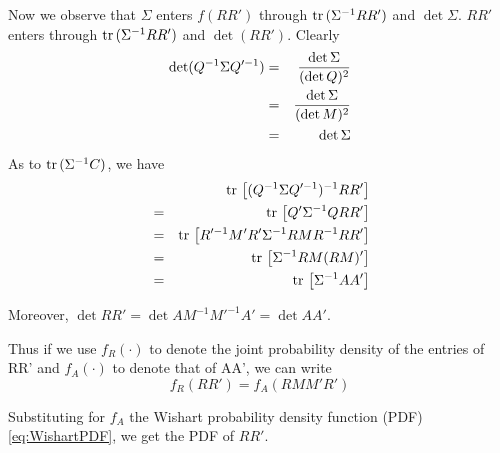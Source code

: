 \documentclass{report}
\begin{document}
Now we observe that $\Sigma$ enters $f(RR')$ through $\text{tr}\, (\Sigma^{-1}
RR')$ and $\det \Sigma$. $RR'$ enters through $\text{tr}\, (\Sigma^{-1}
RR')$ and $\det (RR')$. Clearly
\begin{eqnarray*}
  \det (Q^{-1}\Sigma Q'^{-1}) &=& \det \Sigma \over (\det Q)^2 \\
  &=& \det \Sigma \over (\det M)^2 \\
  &=& \det \Sigma
\end{eqnarray*}
As to $\text{tr}\, (\Sigma^{-1} C)$, we have
\begin{eqnarray*}
  && \text{tr}\,\left[(Q^{-1}\Sigma Q'^{-1})^{-1} RR'\right] \\
  &=& \text{tr}\,\left[Q'\Sigma^{-1} Q RR'\right] \\
  &=& \text{tr}\,\left[ R'^{-1}M'R'\Sigma^{-1} RMR^{-1} RR'\right] \\
  &=& \text{tr}\,\left[ \Sigma^{-1} RM (RM)'\right] \\
  &=& \text{tr}\,\left[ \Sigma^{-1} AA'\right] \\
\end{eqnarray*}

Moreover, $\det RR' = \det AM^{-1} M'^{-1} A' = \det AA'$.

Thus if we use $f_R(\cdot)$ to denote the joint probability density of
the entries of RR' and $f_A(\cdot)$ to denote that of AA', we can
write
\begin{equation}\label{eq:cross-corr-matrix-PDF}
  f_R(RR') = f_A(RMM'R')
\end{equation}

Substituting for $f_A$ the Wishart probability density function (PDF)
\ref{eq:WishartPDF}, we get the PDF of $RR'$.
\end{document}
